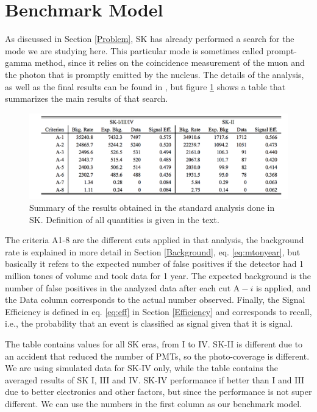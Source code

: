 
\section{Benchmark Model} \label{Benchmark}

As discussed in Section \ref{Problem}, SK has already performed a search for the mode we are studying here. This particular mode is sometimes called prompt-gamma method, since it relies on the coincidence measurement of the muon and the photon that is promptly emitted by the nucleus. The details of the analysis, as well as the final results can be found in \cite{Miura}, but figure \ref{fig:benchmark} shows a table that summarizes the main results of that search.

\begin{figure}[h]
  \centering
  \includegraphics[width=0.8\linewidth]{figs/benchmark.png}
  \caption{Summary of the results obtained in the standard analysis done in SK. Definition of all quantities is given in the text.}
  \label{fig:benchmark}
\end{figure}

The criteria A1-8 are the different cuts applied in that analysis, the background rate is explained in more detail in Section \ref{Background}, eq. \ref{eq:mtonyear}, but basically it refers to the expected number of false positives if the detector had 1 million tones of volume and took data for 1 year. The expected background is the number of false positives in the analyzed data after each cut $\textrm{A}-i$ is applied, and the Data column corresponds to the actual number observed. 
Finally, the Signal Efficiency is defined in eq. \ref{eq:eff} in Section \ref{Efficiency} and corresponds to recall, i.e., the probability that an event is classified as signal given that it is signal.

The table contains values for all SK eras, from I to IV. SK-II is different due to an accident that reduced the number of PMTs, so the photo-coverage is different. We are using simulated data for SK-IV only, while the table contains the averaged results of SK I, III and IV. SK-IV performance if better than I and III due to better electronics and other factors,  but since the performance is not super different. We can use the numbers in the first column as our benchmark model.


